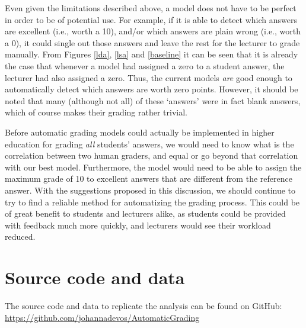 \documentclass[a4paper,10pt,twoside]{article}
\begin{document}
Even given the limitations described above, a model does not have to be perfect in order to be of potential use. For example, if it is able to detect which answers are excellent (i.e., worth a 10), and/or which answers are plain wrong (i.e., worth a 0), it could single out those answers and leave the rest for the lecturer to grade manually. From Figures \ref{lda}, \ref{lsa} and \ref{baseline} it can be seen that it is already the case that whenever a model had assigned a zero to a student answer, the lecturer had also assigned a zero. Thus, the current models \textit{are} good enough to automatically detect which answers are worth zero points. However, it should be noted that many (although not all) of these `answers' were in fact blank answers, which of course makes their grading rather trivial. 

Before automatic grading models could actually be implemented in higher education for grading \textit{all} students' answers, we would need to know what is the correlation between two human graders, and equal or go beyond that correlation with our best model. Furthermore, the model would need to be able to assign the maximum grade of 10 to excellent answers that are different from the reference answer. With the suggestions proposed in this discussion, we should continue to try to find a reliable method for automatizing the grading process. This could be of great benefit to students and lecturers alike, as students could be provided with feedback much more quickly, and lecturers would see their workload reduced.

\section*{Source code and data}
The source code and data to replicate the analysis can be found on GitHub: \url{https://github.com/johannadevos/AutomaticGrading}

 
 

\newpage
\end{document}
